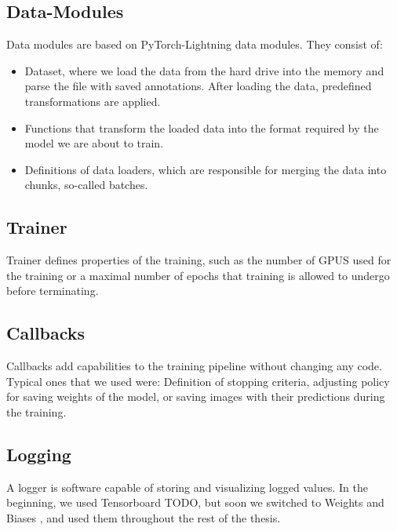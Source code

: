 \subsection{Data-Modules}
Data modules are based on PyTorch-Lightning data modules. They consist of:
\begin{itemize}
    \item Dataset, where we load the data from the hard drive into the memory and parse the file with saved annotations. After loading the data, predefined transformations are applied.
    \item Functions that transform the loaded data into the format required by the model we are about to train.
    \item Definitions of data loaders, which are responsible for merging the data into chunks, so-called batches.
\end{itemize}
\subsection{Trainer}
Trainer defines properties of the training, such as the number of GPUS used for the training or a maximal number of epochs that training is allowed to undergo before terminating.

\subsection{Callbacks}
Callbacks add capabilities to the training pipeline without changing any code. Typical ones that we used were: Definition of stopping criteria, adjusting policy for saving weights of the model, or saving images with their predictions during the training.

\subsection{Logging}
A logger is software capable of storing and visualizing logged values. In the beginning, we used Tensorboard TODO, but soon we switched to Weights and Biases \cite{wandb}, and used them throughout the rest of the thesis.

